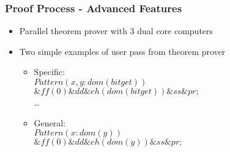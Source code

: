 \begin{frame}
\frametitle{Proof Process - Advanced Features}

	\begin{itemize}
	\item Parallel theorem prover with 3 dual core computers 
	\item Two simple examples of user pass from theorem prover
	
 		\begin{itemize}
 		   \item Specific:\\
 		  	 $Pattern( x , y : dom(bitget) )$ \\ $\& ff(0) \& dd \& eh(dom(bitget)) \& ss \& pr;$\\
 		    \ldots
 		   \item General:\\
 		   	$Pattern( x : dom(y) )$ \\ $\& ff(0) \& dd \& eh(dom(y)) \& ss \& pr;$
         \end{itemize}
        
    \end{itemize}
    
\end{frame}



